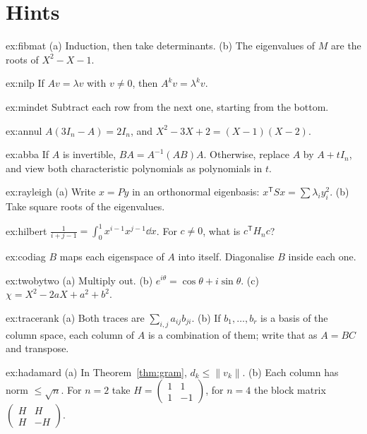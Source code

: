 \section{Hints}

\begin{hint}{ex:fibmat}
(a) Induction, then take determinants. (b) The eigenvalues of $M$ are the roots of $X^2-X-1$.
\end{hint}
\begin{hint}{ex:nilp}
If $Av=\lambda v$ with $v\ne0$, then $A^kv=\lambda^kv$.
\end{hint}
\begin{hint}{ex:mindet}
Subtract each row from the next one, starting from the bottom.
\end{hint}
\begin{hint}{ex:annul}
$A(3I_n-A)=2I_n$, and $X^2-3X+2=(X-1)(X-2)$.
\end{hint}
\begin{hint}{ex:abba}
If $A$ is invertible, $BA=A^{-1}(AB)A$. Otherwise, replace $A$ by $A+tI_n$, and view both characteristic polynomials as polynomials in $t$.
\end{hint}
\begin{hint}{ex:rayleigh}
(a) Write $x=Py$ in an orthonormal eigenbasis: $x^{\mathsf T}Sx=\sum\lambda_iy_i^2$. (b) Take square roots of the eigenvalues.
\end{hint}
\begin{hint}{ex:hilbert}
$\frac1{i+j-1}=\int_0^1x^{i-1}x^{j-1}\dd x$. For $c\ne0$, what is $c^{\mathsf T}H_nc$?
\end{hint}
\begin{hint}{ex:codiag}
$B$ maps each eigenspace of $A$ into itself. Diagonalise $B$ inside each one.
\end{hint}
\begin{hint}{ex:twobytwo}
(a) Multiply out. (b) $e^{i\theta}=\cos\theta+i\sin\theta$. (c) $\chi=X^2-2aX+a^2+b^2$.
\end{hint}
\begin{hint}{ex:tracerank}
(a) Both traces are $\sum_{i,j}a_{ij}b_{ji}$. (b) If $b_1,\dots,b_r$ is a basis of the column space, each column of $A$ is a combination of them; write that as $A=BC$ and transpose.
\end{hint}
\begin{hint}{ex:hadamard}
(a) In Theorem~\ref{thm:gram}, $d_k\le\|v_k\|$. (b) Each column has norm $\le\sqrt n$. For $n=2$ take $H=\begin{pmatrix}1&1\\1&-1\end{pmatrix}$, for $n=4$ the block matrix $\begin{pmatrix}H&H\\H&-H\end{pmatrix}$.
\end{hint}
